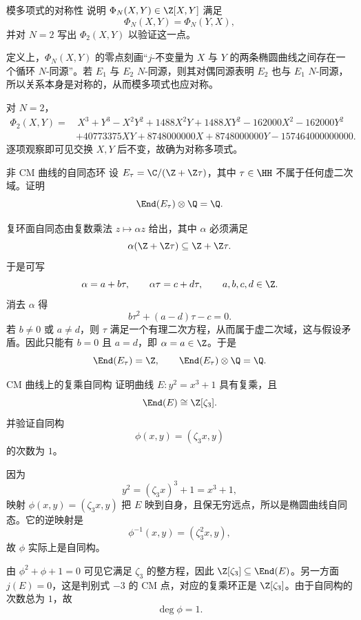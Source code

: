 \begin{problem}{模多项式的对称性 \medium}
说明 $\Phi_N(X,Y)\in\Z[X,Y]$ 满足
\[
\Phi_N(X,Y)=\Phi_N(Y,X),
\]
并对 $N=2$ 写出 $\Phi_2(X,Y)$ 以验证这一点。
\end{problem}
\begin{solution}
定义上，$\Phi_N(X,Y)$ 的零点刻画“$j$-不变量为 $X$ 与 $Y$ 的两条椭圆曲线之间存在一个循环 $N$-同源”。若 $E_1$ 与 $E_2$ $N$-同源，则其对偶同源表明 $E_2$ 也与 $E_1$ $N$-同源，所以关系本身是对称的，从而模多项式也应对称。

对 $N=2$，
\begin{align*}
\Phi_2(X,Y)=&\,X^3+Y^3-X^2Y^2+1488X^2Y+1488XY^2-162000X^2-162000Y^2\\
&+40773375XY+8748000000X+8748000000Y-157464000000000.
\end{align*}
逐项观察即可见交换 $X,Y$ 后不变，故确为对称多项式。
\end{solution}

\begin{problem}{非 CM 曲线的自同态环 \medium}
设 $E_\tau=\C/(\Z+\Z\tau)$，其中 $\tau\in\HH$ 不属于任何虚二次域。证明
\[
\End(E_\tau)\otimes\Q=\Q.
\]
\end{problem}
\begin{solution}
复环面自同态由复数乘法 $z\mapsto \alpha z$ 给出，其中 $\alpha$ 必须满足
\[
\alpha(\Z+\Z\tau)\subseteq \Z+\Z\tau.
\]
于是可写
\[
\alpha=a+b\tau,
\qquad
\alpha\tau=c+d\tau,
\qquad a,b,c,d\in\Z.
\]
消去 $\alpha$ 得
\[
b\tau^2+(a-d)\tau-c=0.
\]
若 $b\neq 0$ 或 $a\neq d$，则 $\tau$ 满足一个有理二次方程，从而属于虚二次域，这与假设矛盾。因此只能有 $b=0$ 且 $a=d$，即 $\alpha=a\in\Z$。于是
\[
\End(E_\tau)=\Z,
\qquad
\End(E_\tau)\otimes\Q=\Q.
\]
\end{solution}

\begin{problem}{CM 曲线上的复乘自同构 \medium}
证明曲线 $E:y^2=x^3+1$ 具有复乘，且
\[
\End(E)\cong \Z[\zeta_3].
\]
并验证自同构
\[
\phi(x,y)=(\zeta_3 x,y)
\]
的次数为 $1$。
\end{problem}
\begin{solution}
因为
\[
y^2=(\zeta_3 x)^3+1=x^3+1,
\]
映射 $\phi(x,y)=(\zeta_3 x,y)$ 把 $E$ 映到自身，且保无穷远点，所以是椭圆曲线自同态。它的逆映射是
\[
\phi^{-1}(x,y)=(\zeta_3^2x,y),
\]
故 $\phi$ 实际上是自同构。

由 $\phi^2+\phi+1=0$ 可见它满足 $\zeta_3$ 的整方程，因此 $\Z[\zeta_3]\subseteq\End(E)$。另一方面 $j(E)=0$，这是判别式 $-3$ 的 CM 点，对应的复乘环正是 $\Z[\zeta_3]$。由于自同构的次数总为 $1$，故
\[
\deg\phi=1.
\]
\end{solution}

